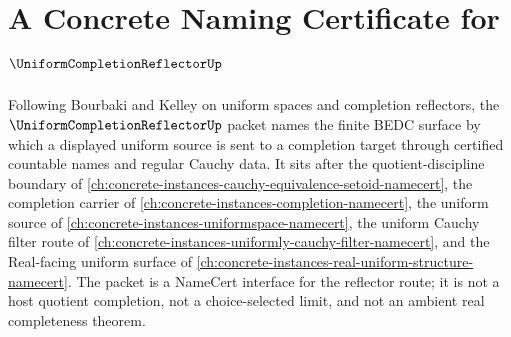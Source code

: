 \chapter{A Concrete Naming Certificate for $\UniformCompletionReflectorUp$}
\label{ch:concrete-instances-uniform-completion-reflector-namecert}

Following Bourbaki and Kelley on uniform spaces and completion reflectors, the $\UniformCompletionReflectorUp$ packet names the finite BEDC surface by which a displayed uniform source is sent to a completion target through certified countable names and regular Cauchy data. It sits after the quotient-discipline boundary of \autoref{ch:concrete-instances-cauchy-equivalence-setoid-namecert}, the completion carrier of \autoref{ch:concrete-instances-completion-namecert}, the uniform source of \autoref{ch:concrete-instances-uniformspace-namecert}, the uniform Cauchy filter route of \autoref{ch:concrete-instances-uniformly-cauchy-filter-namecert}, and the Real-facing uniform surface of \autoref{ch:concrete-instances-real-uniform-structure-namecert}. The packet is a NameCert interface for the reflector route; it is not a host quotient completion, not a choice-selected limit, and not an ambient real completeness theorem.

